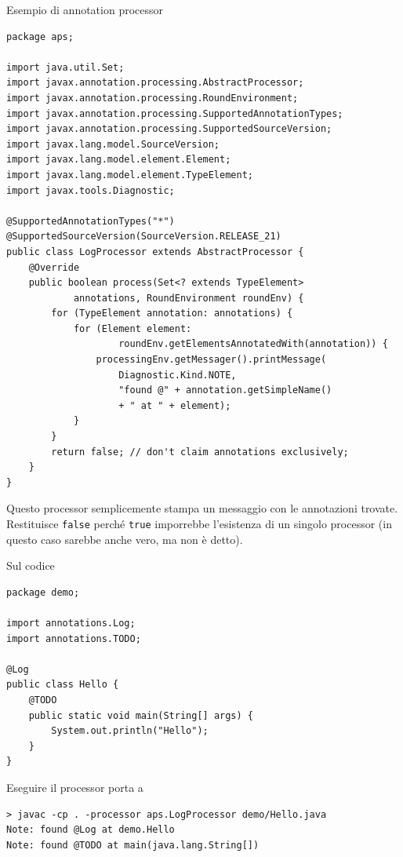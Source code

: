 Esempio di annotation processor
\begin{verbatim}
package aps;

import java.util.Set;
import javax.annotation.processing.AbstractProcessor;
import javax.annotation.processing.RoundEnvironment;
import javax.annotation.processing.SupportedAnnotationTypes;
import javax.annotation.processing.SupportedSourceVersion;
import javax.lang.model.SourceVersion;
import javax.lang.model.element.Element;
import javax.lang.model.element.TypeElement;
import javax.tools.Diagnostic;

@SupportedAnnotationTypes("*")
@SupportedSourceVersion(SourceVersion.RELEASE_21)
public class LogProcessor extends AbstractProcessor {
    @Override
    public boolean process(Set<? extends TypeElement>
            annotations, RoundEnvironment roundEnv) {
        for (TypeElement annotation: annotations) {
            for (Element element:
                    roundEnv.getElementsAnnotatedWith(annotation)) {
                processingEnv.getMessager().printMessage(
                    Diagnostic.Kind.NOTE,
                    "found @" + annotation.getSimpleName()
                    + " at " + element);
            }
        }
        return false; // don't claim annotations exclusively;
    }
}
\end{verbatim}
Questo processor semplicemente stampa un messaggio con le annotazioni trovate. Restituisce \texttt{false} perché \texttt{true} imporrebbe l'esistenza di un singolo processor (in questo caso sarebbe anche vero, ma non è detto).

Sul codice
\begin{verbatim}
package demo;

import annotations.Log;
import annotations.TODO;

@Log
public class Hello {
    @TODO
    public static void main(String[] args) {
        System.out.println("Hello");
    }
}
\end{verbatim}

Eseguire il processor porta a
\begin{verbatim}
> javac -cp . -processor aps.LogProcessor demo/Hello.java
Note: found @Log at demo.Hello
Note: found @TODO at main(java.lang.String[])
\end{verbatim}


